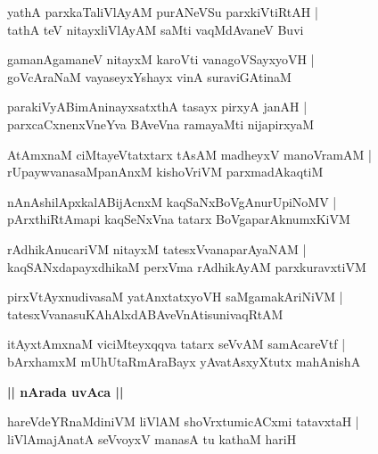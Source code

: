 \documentclass[twoside,12pt,openright]{book}
\newcounter{shloka}[chapter]
\def\uvaca#1{\centerline{{\large\textbf{#1}}}}
\begin{document}
\begin{shloka}%
yathA parxkaTaliVlAyAM purANeVSu parxkiVtiRtAH |\\
tathA teV nitayxliVlAyAM saMti vaqMdAvaneV Buvi 
\end{shloka}

\begin{shloka}%
gamanAgamaneV nitayxM karoVti vanagoVSayxyoVH |\\
goVcAraNaM vayaseyxYshayx vinA suraviGAtinaM 
\end{shloka}

\begin{shloka}%
parakiVyABimAninayxsatxthA tasayx pirxyA janAH |\\
parxcaCxnenxVneYva BAveVna ramayaMti nijapirxyaM 
\end{shloka}

\begin{shloka}%
AtAmxnaM ciMtayeVtatxtarx tAsAM madheyxV manoVramAM |\\
rUpaywvanasaMpanAnxM kishoVriVM parxmadAkaqtiM 
\end{shloka}

\begin{shloka}%
nAnAshilApxkalABijAcnxM kaqSaNxBoVgAnurUpiNoMV |\\
pArxthiRtAmapi kaqSeNxVna tatarx BoVgaparAknumxKiVM 
\end{shloka}

\begin{shloka}%
rAdhikAnucariVM nitayxM tatesxVvanaparAyaNAM |\\
kaqSANxdapayxdhikaM perxVma rAdhikAyAM parxkuravxtiVM 
\end{shloka}

\begin{shloka}%
pirxVtAyxnudivasaM yatAnxtatxyoVH saMgamakAriNiVM |\\
tatesxVvanasuKAhAlxdABAveVnAtisunivaqRtAM 
\end{shloka}

\begin{shloka}%
itAyxtAmxnaM viciMteyxqqva tatarx seVvAM samAcareVtf |\\
bArxhamxM mUhUtaRmAraBayx yAvatAsxyXtutx mahAnishA 
\end{shloka}

\uvaca{|| nArada uvAca ||}

\begin{shloka}%
hareVdeYRnaMdiniVM liVlAM shoVrxtumicACxmi tatavxtaH |\\
liVlAmajAnatA seVvoyxV manasA tu kathaM hariH 
\end{shloka}
\end{document}

